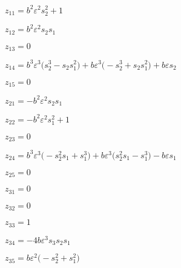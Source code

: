 \documentclass[11pt,a5paper]{article}
\def\eps{\varepsilon}
\begin{document}
\(z_{11}=b^{2} \eps^{2} s_{2}^{2}+1
\)\par

\(z_{12}=b^{2} \eps^{2} s_{2} s_{1}
\)\par

\(z_{13}=0
\)\par

\(z_{14}=b^{3} \eps^{3} \big(s_{2}^{3}-s_{2} s_{1}^{2}\big)+b \eps^{3} 
\big(-s_{2}^{3}+s_{2} s_{1}^{2}\big)+b \eps s_{2}
\)\par

\(z_{15}=0
\)\par

\(z_{21}=-b^{2} \eps^{2} s_{2} s_{1}
\)\par

\(z_{22}=-b^{2} \eps^{2} s_{1}^{2}+1
\)\par

\(z_{23}=0
\)\par

\(z_{24}=b^{3} \eps^{3} \big(-s_{2}^{2} s_{1}+s_{1}^{3}\big)+b \eps^{3} 
\big(s_{2}^{2} s_{1}-s_{1}^{3}\big)-b \eps s_{1}
\)\par

\(z_{25}=0
\)\par

\(z_{31}=0
\)\par

\(z_{32}=0
\)\par

\(z_{33}=1
\)\par

\(z_{34}=-4 b \eps^{3} s_{3} s_{2} s_{1}
\)\par

\(z_{35}=b \eps^{2} \big(-s_{2}^{2}+s_{1}^{2}\big)
\)\par
\end{document}
